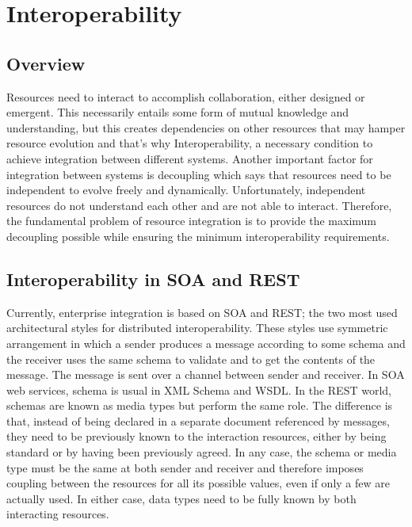 

\chapter{Interoperability}
\label{chapter:interoperability}
\section{Overview}
\label{section:overview}
Resources need to interact to accomplish collaboration, either designed or emergent. This necessarily entails some
form of mutual knowledge and understanding, but this creates dependencies on other resources that may hamper resource
evolution and that's why Interoperability, a necessary condition to achieve integration between different systems.
Another important factor for integration between systems is decoupling which says that resources need to be independent
to evolve freely and dynamically. Unfortunately, independent resources do not understand each other and are not able to
interact. Therefore, the fundamental problem of resource integration is to provide the maximum decoupling possible while
ensuring the minimum interoperability requirements.

\section{Interoperability in SOA and REST}
\label{section:InteroperabilitySOAREST}

Currently, enterprise integration is based on SOA and REST; the two most used architectural styles for distributed
interoperability. These styles use symmetric arrangement in which a sender produces a message according to some schema
and the receiver uses the same schema to validate and to get the contents of the message. The message is sent over a
channel between sender and receiver. In SOA web services, schema is usual in XML Schema and WSDL. In the REST world,
schemas are known as media types but perform the same role. The difference is that, instead of being declared in a
separate document referenced by messages, they need to be previously known to the interaction resources, either by
being standard or by having been previously agreed. In any case, the schema or media type must be the same at both
sender and receiver and therefore imposes coupling between the resources for all its possible values, even if only a
few are actually used. In either case, data types need to be fully known by both interacting resources.

